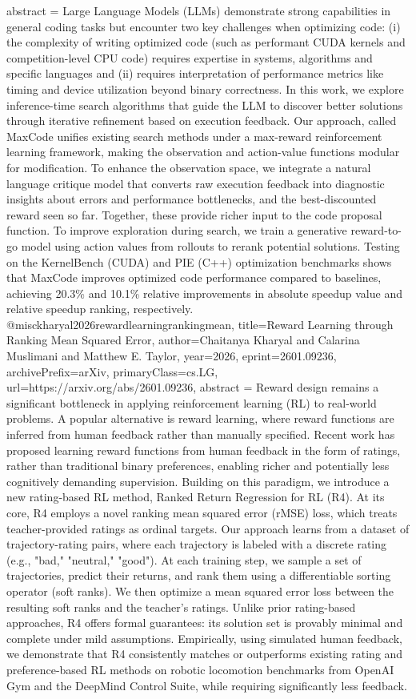 {      abstract = {Large Language Models (LLMs) demonstrate strong capabilities in general coding tasks but encounter two key challenges when optimizing code: (i) the complexity of writing optimized code (such as performant CUDA kernels and competition-level CPU code) requires expertise in systems, algorithms and specific languages and (ii) requires interpretation of performance metrics like timing and device utilization beyond binary correctness. In this work, we explore inference-time search algorithms that guide the LLM to discover better solutions through iterative refinement based on execution feedback. Our approach, called MaxCode unifies existing search methods under a max-reward reinforcement learning framework, making the observation and action-value functions modular for modification. To enhance the observation space, we integrate a natural language critique model that converts raw execution feedback into diagnostic insights about errors and performance bottlenecks, and the best-discounted reward seen so far. Together, these provide richer input to the code proposal function. To improve exploration during search, we train a generative reward-to-go model using action values from rollouts to rerank potential solutions. Testing on the KernelBench (CUDA) and PIE (C++) optimization benchmarks shows that MaxCode improves optimized code performance compared to baselines, achieving 20.3\% and 10.1\% relative improvements in absolute speedup value and relative speedup ranking, respectively.}
}@misc{kharyal2026rewardlearningrankingmean,
      title={Reward Learning through Ranking Mean Squared Error}, 
      author={Chaitanya Kharyal and Calarina Muslimani and Matthew E. Taylor},
      year={2026},
      eprint={2601.09236},
      archivePrefix={arXiv},
      primaryClass={cs.LG},
      url={https://arxiv.org/abs/2601.09236},
      abstract = {Reward design remains a significant bottleneck in applying reinforcement learning (RL) to real-world problems. A popular alternative is reward learning, where reward functions are inferred from human feedback rather than manually specified. Recent work has proposed learning reward functions from human feedback in the form of ratings, rather than traditional binary preferences, enabling richer and potentially less cognitively demanding supervision. Building on this paradigm, we introduce a new rating-based RL method, Ranked Return Regression for RL (R4). At its core, R4 employs a novel ranking mean squared error (rMSE) loss, which treats teacher-provided ratings as ordinal targets. Our approach learns from a dataset of trajectory-rating pairs, where each trajectory is labeled with a discrete rating (e.g., "bad," "neutral," "good"). At each training step, we sample a set of trajectories, predict their returns, and rank them using a differentiable sorting operator (soft ranks). We then optimize a mean squared error loss between the resulting soft ranks and the teacher's ratings. Unlike prior rating-based approaches, R4 offers formal guarantees: its solution set is provably minimal and complete under mild assumptions. Empirically, using simulated human feedback, we demonstrate that R4 consistently matches or outperforms existing rating and preference-based RL methods on robotic locomotion benchmarks from OpenAI Gym and the DeepMind Control Suite, while requiring significantly less feedback.}
}
